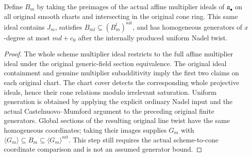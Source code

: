 \begin{proposition}
\label{prop:c0n-original-multiplier-cone-ideal}
Define $B_m$ by taking the preimages of the actual affine multiplier ideals of
$\mathfrak a_\bullet$ on all original smooth charts and intersecting in the
original cone ring. This same ideal contains $J_m$, satisfies
$B_{ml}\subseteq(B_m^l)^{\mathrm{sat}}$, and has homogeneous generators of
$x$-degree at most $md+c_0$ after the internally produced uniform Nadel twist.
\end{proposition}
\begin{proof}
The whole scheme multiplier ideal restricts to the full affine multiplier
ideal under the original generic-field section equivalence. The original
ideal containment and genuine multiplier subadditivity imply the first two
claims on each original chart. The chart cover detects the corresponding
whole projective ideals, hence their cone relations modulo irrelevant
saturation. Uniform generation is obtained by applying the explicit ordinary
Nadel input and the actual Castelnuovo--Mumford argument to the preceding
original finite generators. Global sections of the resulting original line
twist have the same homogeneous coordinates; taking their images supplies
$G_m$ with $\langle G_m\rangle\subseteq B_m\subseteq
\langle G_m\rangle^{\mathrm{sat}}$. This step still requires the actual
scheme-to-cone coordinate comparison and is not an assumed generator bound.
\end{proof}

